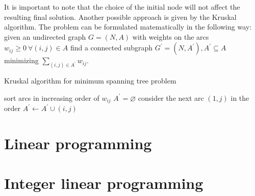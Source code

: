 \documentclass[12pt, a4paper]{report}
\newtheorem[style=M,bodystyle=\normalfont]{theorem}{Theorem}
\newtheorem[style=M,bodystyle=\normalfont]{corollary}{Corollary}
\newtheorem[style=M,bodystyle=\normalfont]{lemma}{Lemma}
\newtheorem[style=M,bodystyle=\normalfont]{definition}{Definition}
\begin{document}
It is important to note that the choice of the initial node will not affect the resulting final solution. 
Another possible approach is given by the Kruskal algorithm. The problem can be formulated matematically in the following way: given an 
undirected graph $G=(N,A)$ with weights on the arcs $w_{ij} \geq 0 \: \forall (i,j) \in A$ find a connected subgraph 
$G^{'}=(N,A^{'}),A^{'} \subseteq A$ minimizing $\sum_{(i,j) \in A^{'}}w_{ij}$.  
\begin{algorithm}
    \caption{Kruskal algorithm for minimum spanning tree problem}
        \begin{algorithmic}[1]
            \State sort arcs in increasing order of $w_{ij}$
            \State $A^{'}=\varnothing$
                \State consider the next arc $(1,j)$ in the order
                \State $A^{'} \leftarrow A^{'} \cup (i,j)$
                \EndIf
            \EndWhile
            \State \Return
        \end{algorithmic}
\end{algorithm}





\newpage

\chapter{Linear programming}



\newpage

\chapter{Integer linear programming}










    

    
\end{document}
